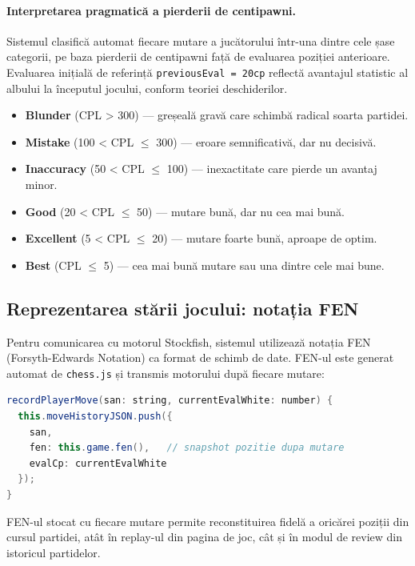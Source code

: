 \documentclass[12pt,a4paper]{article}
\begin{document}
\paragraph{Interpretarea pragmatică a pierderii de centipawni.}
Sistemul clasifică automat fiecare mutare a jucătorului într-una dintre cele șase categorii, pe baza pierderii de centipawni față de evaluarea poziției anterioare. Evaluarea inițială de referință \texttt{previousEval = 20cp} reflectă avantajul statistic al albului la începutul jocului, conform teoriei deschiderilor.
\begin{itemize}
  \item \textbf{Blunder} (CPL > 300) — greșeală gravă care schimbă radical soarta partidei.
  \item \textbf{Mistake} (100 < CPL $\leq$ 300) — eroare semnificativă, dar nu decisivă.
  \item \textbf{Inaccuracy} (50 < CPL $\leq$ 100) — inexactitate care pierde un avantaj minor.
  \item \textbf{Good} (20 < CPL $\leq$ 50) — mutare bună, dar nu cea mai bună.
  \item \textbf{Excellent} (5 < CPL $\leq$ 20) — mutare foarte bună, aproape de optim.
  \item \textbf{Best} (CPL $\leq$ 5) — cea mai bună mutare sau una dintre cele mai bune.
\end{itemize}

\subsection{Reprezentarea stării jocului: notația FEN}

Pentru comunicarea cu motorul Stockfish, sistemul utilizează notația FEN (Forsyth-Edwards Notation) ca format de schimb de date. FEN-ul este generat automat de \texttt{chess.js} și transmis motorului după fiecare mutare:

\begin{lstlisting}[language=Java, caption={Generarea FEN în gameStore.svelte.ts}]
recordPlayerMove(san: string, currentEvalWhite: number) {
  this.moveHistoryJSON.push({
    san,
    fen: this.game.fen(),   // snapshot pozitie dupa mutare
    evalCp: currentEvalWhite
  });
}
\end{lstlisting}

FEN-ul stocat cu fiecare mutare permite reconstituirea fidelă a oricărei poziții din cursul partidei, atât în replay-ul din pagina de joc, cât și în modul de review din istoricul partidelor.
\end{document}
